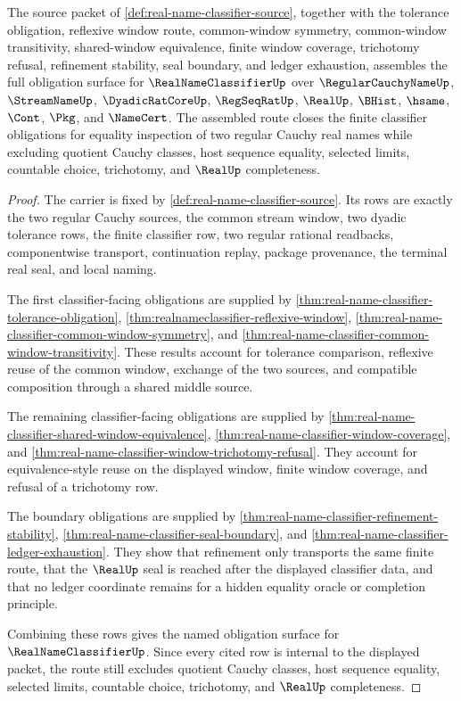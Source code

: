 \begin{theorem}
\label{thm:real-name-classifier-obligation-closure-route}
The source packet of \autoref{def:real-name-classifier-source}, together with the tolerance obligation, reflexive window route, common-window symmetry, common-window transitivity, shared-window equivalence, finite window coverage, trichotomy refusal, refinement stability, seal boundary, and ledger exhaustion, assembles the full obligation surface for $\RealNameClassifierUp$ over $\RegularCauchyNameUp$, $\StreamNameUp$, $\DyadicRatCoreUp$, $\RegSeqRatUp$, $\RealUp$, $\BHist$, $\hsame$, $\Cont$, $\Pkg$, and $\NameCert$. The assembled route closes the finite classifier obligations for equality inspection of two regular Cauchy real names while excluding quotient Cauchy classes, host sequence equality, selected limits, countable choice, trichotomy, and $\RealUp$ completeness.
\end{theorem}
\begin{proof}
The carrier is fixed by \autoref{def:real-name-classifier-source}. Its rows are exactly the two regular Cauchy sources, the common stream window, two dyadic tolerance rows, the finite classifier row, two regular rational readbacks, componentwise transport, continuation replay, package provenance, the terminal real seal, and local naming.

The first classifier-facing obligations are supplied by \autoref{thm:real-name-classifier-tolerance-obligation}, \autoref{thm:realnameclassifier-reflexive-window}, \autoref{thm:real-name-classifier-common-window-symmetry}, and \autoref{thm:real-name-classifier-common-window-transitivity}. These results account for tolerance comparison, reflexive reuse of the common window, exchange of the two sources, and compatible composition through a shared middle source.

The remaining classifier-facing obligations are supplied by \autoref{thm:real-name-classifier-shared-window-equivalence}, \autoref{thm:real-name-classifier-window-coverage}, and \autoref{thm:real-name-classifier-window-trichotomy-refusal}. They account for equivalence-style reuse on the displayed window, finite window coverage, and refusal of a trichotomy row.

The boundary obligations are supplied by \autoref{thm:real-name-classifier-refinement-stability}, \autoref{thm:real-name-classifier-seal-boundary}, and \autoref{thm:real-name-classifier-ledger-exhaustion}. They show that refinement only transports the same finite route, that the $\RealUp$ seal is reached after the displayed classifier data, and that no ledger coordinate remains for a hidden equality oracle or completion principle.

Combining these rows gives the named obligation surface for $\RealNameClassifierUp$. Since every cited row is internal to the displayed packet, the route still excludes quotient Cauchy classes, host sequence equality, selected limits, countable choice, trichotomy, and $\RealUp$ completeness.
\end{proof}

